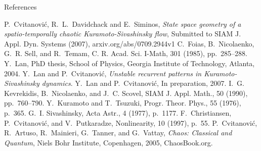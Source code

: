 \documentclass{theo1poster}[2003/04/25]
\begin{document}
\begin{poster}{3}
\begin{sheet}{References}
\begin{thebibliography}{99}
	{\sc P.~Cvitanovi\'c, R.~L.~Davidchack and E.~Siminos},
	\emph{State space geometry of a spatio-temporally chaotic Kuramoto-Sivashinsky flow}, Submitted to
	SIAM J. Appl. Dyn. Systems (2007), arxiv.org/abs/0709.2944v1
{\sc C.~Foias, B.~Nicolaenko, G.~R. Sell, and R.~Temam}, C. R. Acad. Sci. I-Math, 301
  (1985), pp.~285--288.
{\sc Y.~Lan}, PhD thesis, School of Physics, Georgia Institute of
  Technology, Atlanta, 2004.
{\sc Y.~Lan and P.~Cvitanovi\'{c}}, {\em Unstable recurrent patterns in
  {K}uramoto-{S}ivashinsky dynamics}.
{\sc Y.~Lan and P.~Cvitanovi\'{c}}, 
\newblock In preparation, 2007.
{\sc I.~G. Kevrekidis, B.~Nicolaenko, and J.~C. Scovel},  SIAM J. Appl. Math., 50 (1990), pp.~760--790.
{\sc Y.~Kuramoto and T.~Tsuzuki},  Progr. Theor.
  Phys., 55 (1976), p.~365.
{\sc G.~I. Sivashinsky}, Acta Astr., 4
  (1977), p.~1177.
{\sc F.~Christiansen, P.~Cvitanovi\'{c}, and V.~Putkaradze}, Nonlinearity,
  10 (1997), p.~55.
{\sc P.~Cvitanovi\'{c}, R.~Artuso, R.~Mainieri, G.~Tanner, and G.~Vattay}, {\em
  Chaos: Classical and Quantum}, Niels Bohr Institute, Copenhagen, 2005,
  ChaosBook.org.
\end{thebibliography}
\end{sheet}



\end{poster}
\end{document}
